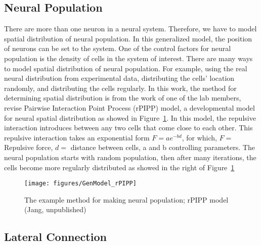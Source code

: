 \subsection{Neural Population}
There are more than one neuron in a neural system. Therefore, we have to model spatial distribution of neural population. In this generalized model, the position of neurons can be set to the system. One of the control factors for neural population is the density of cells in the system of interest. There are many ways to model spatial distribution of neural population. For example, using the real neural distribution from experimental data, distributing the cells' location randomly, and distributing the cells regularly. In this work, the method for determining spatial distribution is from the work of one of the lab members, revise Pairwise Interaction Point Process (rPIPP) model, a developmental model for neural spatial distribution as showed in Figure~\ref{fig:rPIPP}.
In this model, the repulsive interaction introduces between any two cells that come close to each other. This repulsive interaction takes an exponential form $F = a e^{-bd}$, for which, $F =$ Repulsive force, $d = $ distance between cells, a and b controlling parameters. The neural population starts with random population, then after many iterations, the cells become more regularly distributed as showed in the right of Figure~\ref{fig:rPIPP}

\begin{figure}[!t]
	\centering
	\texttt{[image: figures/GenModel\_rPIPP]}
	\caption[The rPIPP model]{The example method for making neural population; rPIPP model (Jang, unpublished)}
	\label{fig:rPIPP}
\end{figure} 

\subsection{Lateral Connection} 

